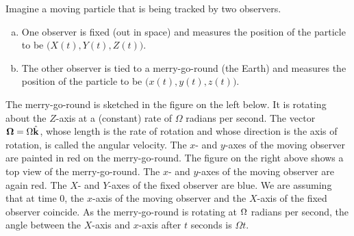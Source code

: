 Imagine a moving particle that is being tracked by two observers.
\begin{enumerate}[(a)]
\item One observer is fixed (out in space) and measures the position of 
  the particle to be $\big(X(t), Y(t), Z(t)\big)$.
\item The other observer is tied to a merry-go-round (the Earth) and 
  measures the position of the particle to be $\big(x(t),y(t),z(t)\big)$.
\end{enumerate}
The merry-go-round is sketched in the figure on the left below. It
is rotating about the $Z$-axis at a (constant) rate of $\Omega$ radians per second.
The vector $\mathbf{\Omega} = \Omega \hat{\mathbf{k}}$, whose length is the rate of rotation and
whose direction is the axis of rotation, is called the angular velocity.
%
The $x$- and $y$-axes of the moving observer are painted in red on
the merry-go-round. The figure on the right above shows a top view of the
merry-go-round. The $x$- and $y$-axes of the moving observer are again
red. The $X$- and $Y$-axes of the fixed observer are blue.  We are
assuming that at time $0$, the $x$-axis of the moving observer and 
the $X$-axis of the fixed observer coincide. As the merry-go-round
is rotating at $\Omega$ radians per second, the angle between the $X$-axis
and $x$-axis after $t$ seconds is $\Omega t$.

